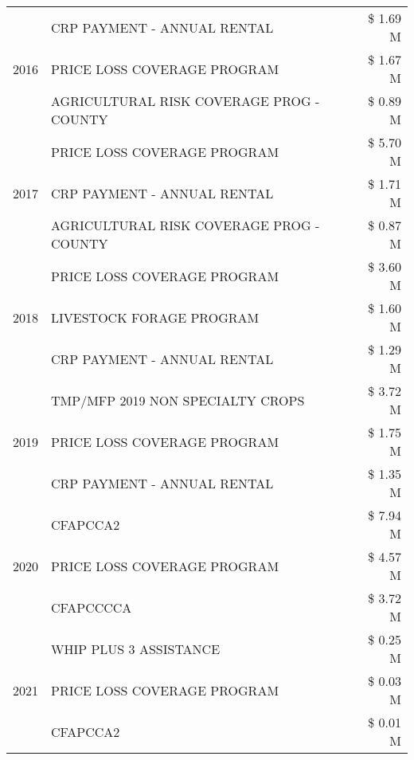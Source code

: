 \begin{tabular}{llr}
\cline{1-3}
\multirow[t]{3}{*}{2016} & CRP PAYMENT - ANNUAL RENTAL & \$ 1.69 M \\
 & PRICE LOSS COVERAGE PROGRAM & \$ 1.67 M \\
 & AGRICULTURAL RISK COVERAGE PROG - COUNTY & \$ 0.89 M \\
\cline{1-3}
\multirow[t]{3}{*}{2017} & PRICE LOSS COVERAGE PROGRAM & \$ 5.70 M \\
 & CRP PAYMENT - ANNUAL RENTAL & \$ 1.71 M \\
 & AGRICULTURAL RISK COVERAGE PROG - COUNTY & \$ 0.87 M \\
\cline{1-3}
\multirow[t]{3}{*}{2018} & PRICE LOSS COVERAGE PROGRAM & \$ 3.60 M \\
 & LIVESTOCK FORAGE PROGRAM & \$ 1.60 M \\
 & CRP PAYMENT - ANNUAL RENTAL & \$ 1.29 M \\
\cline{1-3}
\multirow[t]{3}{*}{2019} & TMP/MFP 2019 NON SPECIALTY CROPS & \$ 3.72 M \\
 & PRICE LOSS COVERAGE PROGRAM & \$ 1.75 M \\
 & CRP PAYMENT - ANNUAL RENTAL & \$ 1.35 M \\
\cline{1-3}
\multirow[t]{3}{*}{2020} & CFAPCCA2 & \$ 7.94 M \\
 & PRICE LOSS COVERAGE PROGRAM & \$ 4.57 M \\
 & CFAPCCCCA & \$ 3.72 M \\
\cline{1-3}
\multirow[t]{3}{*}{2021} & WHIP PLUS 3 ASSISTANCE & \$ 0.25 M \\
 & PRICE LOSS COVERAGE PROGRAM & \$ 0.03 M \\
 & CFAPCCA2 & \$ 0.01 M \\
\cline{1-3}
\bottomrule
\end{tabular}
